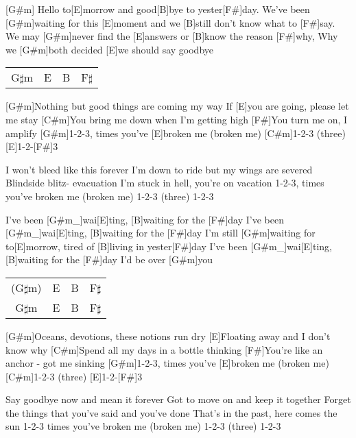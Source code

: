 

\begin{guitar}
	[G#m] Hello to[E]morrow and good[B]bye to yester[F#]day.
	We've been [G#m]waiting for this [E]moment and we [B]still don't know what to [F#]say.
	We may [G#m]never find the [E]answers or [B]know the reason [F#]why,
	Why we [G#m]both decided [E]we should say goodbye
	
	{\footnotesize\begin{tabular}{|l|l|l|l|}
			G$\sharp$m & E & B & F$\sharp$
	\end{tabular} }

	[G#m]Nothing but good things are coming my way
	If [E]you are going, please let me stay
	[C#m]You bring me down when I'm getting high
	[F#]You turn me on, I amplify
	[G#m]1-2-3, times you've [E]broken me (broken me)
	[C#m]1-2-3 (three) [E]1-2-[F#]3
	
	I won't bleed like this forever
	I'm down to ride but my wings are severed
	Blindside blitz- evacuation
	I'm stuck in hell, you're on vacation
	1-2-3, times you've broken me (broken me)
	1-2-3 (three) 1-2-3
	
	\begin{highlightbar}
		I've been [G#m_]{wai}[E]ting, [B]waiting for the [F#]day
		I've been [G#m_]{wai}[E]ting, [B]waiting for the [F#]day
		I'm still [G#m]waiting for to[E]morrow, tired of [B]living in yester[F#]day
		I've been [G#m_]{wai}[E]ting, [B]waiting for the [F#]day I'd be over [G#m]you
	\end{highlightbar}
	
	{\footnotesize\begin{tabular}{|c|l|l|l|}
			(G$\sharp$m) & E & B & F$\sharp$ \\
			G$\sharp$m & E & B & F$\sharp$ 
	\end{tabular}}
	\pagebreak
	[G#m]Oceans, devotions, these notions run dry
	[E]Floating away and I don't know why
	[C#m]Spend all my days in a bottle thinking
	[F#]You're like an anchor - got me sinking
	[G#m]1-2-3, times you've [E]broken me (broken me)
	[C#m]1-2-3 (three) [E]1-2-[F#]3
	
	Say goodbye now and mean it forever
	Got to move on and keep it together
	Forget the things that you've said and you've done
	That's in the past, here comes the sun
	1-2-3 times you've broken me (broken me)
	1-2-3 (three) 1-2-3
	

\end{guitar}
